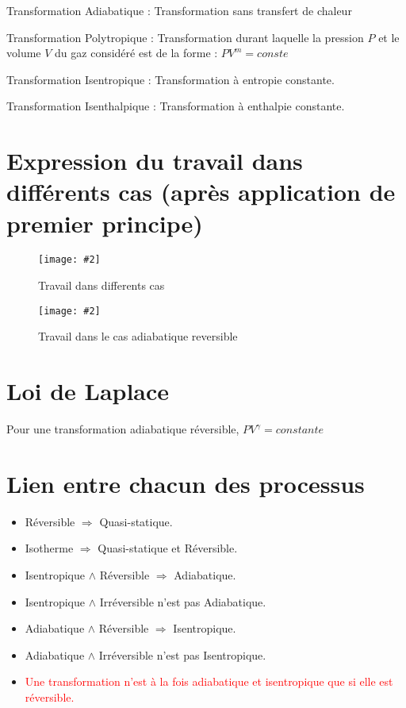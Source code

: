 \documentclass[a4paper, 11pt, hidelinks]{article}
\newcommand{\img}[4]{\begin{figure}[!ht]
    \centering
    \texttt{[image: \#2]}
    \caption{#3}
    \label{#4}
    \end{figure} }
\begin{document}
\begin{definition}
    Transformation Adiabatique : Transformation sans transfert de chaleur
\end{definition}



\begin{definition}
    Transformation Polytropique : Transformation durant laquelle la pression $P$ et le volume $V$ du gaz considéré est de la forme : $PV^m=conste$
\end{definition}


\begin{definition}
    Transformation Isentropique : Transformation à entropie constante. 
\end{definition}


\begin{definition}
    Transformation Isenthalpique : Transformation à enthalpie constante.
\end{definition}




\section{Expression du travail dans différents cas (après application de premier principe)}

\img{0.5}{Travail dans differents cas.png}{Travail dans differents cas}{Figure 1}



\img{0.5}{Travail dans le cas adiabatique reversible.png}{Travail dans le cas adiabatique reversible}{Figure 2}

\section{Loi de Laplace}

Pour une transformation adiabatique réversible, $PV^{\gamma}=constante$


\section{Lien entre chacun des processus}

\begin{itemize}
    \item Réversible $\Rightarrow$ Quasi-statique.
    \item Isotherme $\Rightarrow$ Quasi-statique et Réversible.
    \item Isentropique $\land$ Réversible $\Rightarrow$ Adiabatique.
    \item Isentropique $\land$ Irréversible n'est pas Adiabatique.
    \item Adiabatique $\land$ Réversible $\Rightarrow$ Isentropique.
    \item Adiabatique $\land$ Irréversible n'est pas Isentropique.
    \item \textcolor{red}{Une transformation n'est à la fois adiabatique et isentropique que si elle est réversible.}
\end{itemize}
\end{document}
